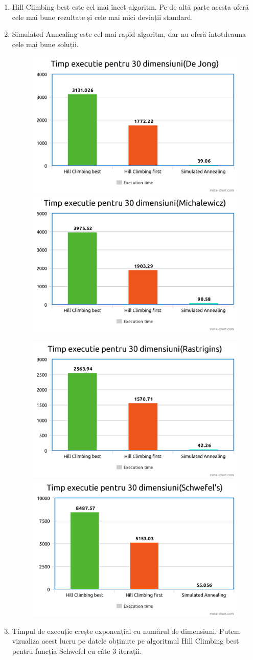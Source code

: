 \documentclass{article}
\begin{document}
\begin{enumerate}
 \item Hill Climbing best este cel mai încet algoritm. Pe de altă parte acesta oferă cele mai bune rezultate și cele mai mici deviații standard.
 \item Simulated Annealing este cel mai rapid algoritm, dar nu oferă întotdeauna cele mai bune soluții.
\begin{figure}[h!]
\begin{multicols}{2}
    \includegraphics[width=.43\textwidth]{metachart}
    \includegraphics[width=.43\textwidth]{metachart1}
    \end{multicols}
\begin{multicols}{2}
    \includegraphics[width=.43\textwidth]{metachart2}
    \includegraphics[width=.43\textwidth]{metachart3}
    \end{multicols}
\end{figure}
 \item Timpul de execuție crește exponențial cu numărul de dimensiuni. Putem vizualiza acest lucru pe datele obținute pe algoritmul Hill Climbing best pentru funcția Schwefel cu câte 3 iterații.

\end{enumerate}
\end{document}

